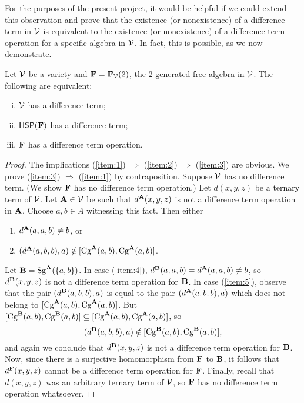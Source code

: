 For the purposes of the present project,
it would be helpful if we could extend this observation and
prove that the existence (or nonexistence) of a difference term in $\mathcal{V}$
is equivalent to the  existence (or nonexistence) of a difference term
operation for a specific algebra in $\mathcal{V}$.  In fact, this is possible, as we
now demonstrate.

\begin{thm}
  \label{thm:F}
Let $\mathcal{V}$ be a variety and $\mathbf{F} = \mathbf{F}_{\mathcal{V}}(2)$, the 2-generated
free algebra in $\mathcal{V}$. The following are equivalent:
\begin{enumerate}[(i)]
\item \label{item:1}
  $\mathcal{V}$ has a difference term;
\item \label{item:2}
  $\mathsf{H} \mathsf{S} \mathsf{P} (\mathbf{F})$ has a difference term;
\item \label{item:3}
  $\mathbf{F}$ has a difference term operation.
\end{enumerate}
\end{thm}
\begin{proof}
  The implications
  (\ref{item:1}) $\Rightarrow$  (\ref{item:2}) $\Rightarrow$  (\ref{item:3}) are
  obvious. We prove
  (\ref{item:3}) $\Rightarrow$  (\ref{item:1}) by contraposition.
  Suppose $\mathcal{V}$ has no difference term. (We show $\mathbf{F}$ has no difference term
  operation.)
  Let $d(x,y,z)$ be a ternary term of $\mathcal{V}$.  Let $\mathbf{A}\in \mathcal{V}$ be such that
  $d^{\mathbf{A}}(x,y,z)$ is not a difference term operation in $\mathbf{A}$.
  Choose $a, b \in A$ witnessing this fact.  Then either
  \begin{enumerate}
  \item\label{item:4} $d^{\mathbf{A}}(a,a,b) \neq b$, or
  \item\label{item:5} $(d^{\mathbf{A}}(a,b,b), a) \notin [\operatorname{Cg}^{\mathbf{A}} (a, b), \operatorname{Cg}^{\mathbf{A}} (a,b)]$.
  \end{enumerate}
  Let $\mathbf{B} = \operatorname{Sg}^{\mathbf{A}} (\{a, b\})$.  In case
  (\ref{item:4}), 
  $d^{\mathbf{B}}(a,a,b) = d^{\mathbf{A}}(a,a,b) \neq b$, so $d^{\mathbf{B}}(x,y,z)$ is not a difference
  term operation for $\mathbf{B}$.
  In case (\ref{item:5}), observe that
  the pair $(d^{\mathbf{B}}(a,b,b), a)$ is equal to the pair $(d^{\mathbf{A}}(a,b,b), a)$ which
  does not belong to $[\operatorname{Cg}^{\mathbf{A}} (a, b), \operatorname{Cg}^{\mathbf{A}} (a,b)]$.
  But 
  $[\operatorname{Cg}^{\mathbf{B}} (a, b), \operatorname{Cg}^{\mathbf{B}} (a,b)] \subseteq[\operatorname{Cg}^{\mathbf{A}} (a, b), \operatorname{Cg}^{\mathbf{A}} (a,b)]$, so
  \[(d^{\mathbf{B}}(a,b,b), a) \notin [\operatorname{Cg}^{\mathbf{B}} (a, b), \operatorname{Cg}^{\mathbf{B}} (a,b)],\]
  and again we conclude that $d^{\mathbf{B}}(x,y,z)$ is not a difference term operation for $\mathbf{B}$.
  Now, since there is a surjective homomorphism from $\mathbf{F}$ to $\mathbf{B}$,
  it follows that $d^{\mathbf{F}}(x,y,z)$ cannot be a difference term operation for $\mathbf{F}$.
  Finally, recall that $d(x,y,z)$ was an arbitrary ternary term of $\mathcal{V}$, so
  $\mathbf{F}$ has no difference term operation whatsoever.
\end{proof}












